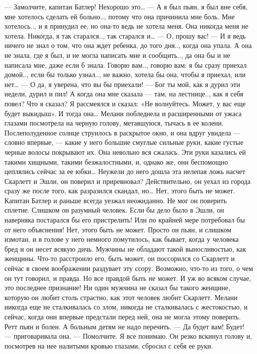 — Замолчите, капитан Батлер! Нехорошо это…
— А я был пьян, я был вне себя, мне хотелось сделать ей больно.., потому что она причинила мне боль. Мне хотелось.., и я принудил ее, но она-то ведь не хотела меня. Она никогда меня не хотела. Никогда, я так старался.., так старался и…
— О, прошу вас!
— И я ведь ничего не знал о том, что она ждет ребенка, до того дня.., когда она упала. А она не знала, где я был, и не могла написать мне и сообщить.., да она бы и не написала мне, даже если б знала. Говорю вам.., говорю вам: я бы сразу приехал домой.., если бы только узнал.., не важно, хотела бы она, чтобы я приехал, или нет…
— О да, я уверена, что вы бы приехали!
— Бог ты мой, как я дурил эти недели, дурил и пил! А когда она мне сказала — там, на лестнице.., как я себя повел? Что я сказал? Я рассмеялся и сказал: «Не волнуйтесь. Может, у вас еще будет выкидыш». И тогда она…
Мелани побледнела и расширенными от ужаса глазами посмотрела на черную голову, метавшуюся, тычась в ее колени. Послеполуденное солнце струилось в раскрытое окно, и она вдруг увидела — словно впервые, — какие у него большие смуглые сильные руки, какие густые черные волосы покрывают их. Она невольно вся сжалась. Эти руки казались ей такими хищными, такими безжалостными, и, однако же, они беспомощно цеплялись сейчас за ее юбки…
Неужели до него дошла эта нелепая ложь насчет Скарлетт и Эшли, он поверил и приревновал? Действительно, он уехал из города сразу же после того, как разразился скандал, но… Нет, этого быть не может. Капитан Батлер и раньше всегда уезжал неожиданно. Не мог он поверить сплетне. Слишком он разумный человек. Если бы дело было в Эшли, он наверняка постарался бы его пристрелить! Или по крайней мере потребовал бы от него объяснения!
Нет, этого быть не может. Просто он пьян, и слишком измотан, и в голове у него немного помутилось, как бывает, когда у человека бред и он несет всякую дичь. Мужчины не обладают такой выносливостью, как женщины. Что-то расстроило его, быть может, он поссорился со Скарлетт и сейчас в своем воображении раздувает эту ссору. Возможно, что-то из того, о чем он тут говорил, и правда. Но все правдой быть не может. И уж во всяком случае, это последнее признание! Ни один мужчина не сказал бы такого женщине, которую он любит столь страстно, как этот человек любит Скарлетт. Мелани никогда еще не сталкивалась со злом, никогда не сталкивалась с жестокостью, и сейчас, когда они впервые предстали перед ней, она не могла этому поверить. Ретт пьян и болен. А больным детям не надо перечить.
— Да будет вам! Будет! — приговаривала она. — Помолчите. Я все понимаю.
Он резко вскинул голову и, посмотрев на нее налитыми кровью глазами, сбросил с себя ее руки.
